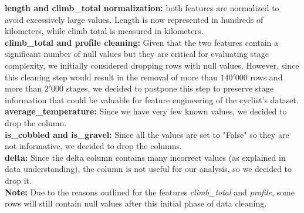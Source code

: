 \noindent
\textbf{length and climb\_total normalization:} both features are normalized to avoid excessively large values. Length is now represented in hundreds of kilometers, while climb total is measured in kilometers.\\

\noindent
\textbf{climb\_total and profile cleaning:}
Given that the two features contain a significant number of null values but they are critical for evaluating stage complexity, we initially considered dropping rows with null values. However, since this cleaning step would result in the removal of more than $140'000$ rows and more than $2'000$ stages, we decided to postpone this step to preserve stage information that could be valuable for feature engineering of the cyclist's dataset. \\

\noindent
\textbf{average\_temperature:}
Since we have very few known values, we decided to drop the column.\\

\noindent
\textbf{is\_cobbled and is\_gravel:}
Since all the values are set to "False" so they are not informative, we decided to drop the columns.\\

\noindent
\textbf{delta:}
Since the delta column contains many incorrect values (as explained in data understanding), the column is not useful for our analysis, so we decided to drop it.\\

\noindent
\textbf{Note:} Due to the reasons outlined for the features \textit{climb\_total} and \textit{profile}, some rows will still contain null values after this initial phase of data cleaning.